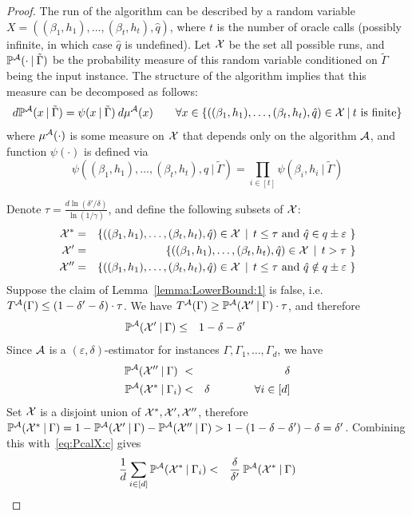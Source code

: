\documentclass[final,12pt]{colt2018}
\def\P{{\mathbb P}}
\def\calA{{\cal A}}
\def\calX{{\cal X}}
\begin{document}
\begin{proof}
The run of the algorithm can be described by a random variable $X=((\beta_1,h_1),\ldots,(\beta_t,h_t),\hat q)$,
where $t$ is the number of oracle calls (possibly infinite, in which case $\hat q$ is undefined).
Let $\calX$ be the set all possible runs, and %
 $\P^\calA(\cdot\:|\:\tilde\Gamma)$ be the probability measure of this random variable conditioned on
$\tilde\Gamma$ being the input instance. The structure of the algorithm implies that this measure can be decomposed as follows:
\begin{equation}
d\P^\calA(x\:|\:\tilde\Gamma)= \psi(x\:|\:\tilde\Gamma)\:d\mu^\calA(x)
\qquad\forall x\in\{((\beta_1,h_1),\ldots,(\beta_t,h_t),\hat q)\in\calX\:|\:\mbox{$t$ is finite}\}
\label{eq:GALSKGHAKSFJASG}
\end{equation}
where $\mu^\calA(\cdot)$ is some measure on $\calX$ that depends only on the algorithm $\calA$, and function $\psi(\cdot)$ is defined via
$$
\psi((\beta_1,h_1),\ldots,(\beta_t,h_t),\hat q\:|\:\tilde\Gamma)=\prod_{i\in[t]} \psi(\beta_i,h_i\:|\:\tilde\Gamma)
$$


Denote $\tau=\frac{d\ln(\delta'/\delta)}{\ln(1/\gamma)}$, and define the following subsets of $\calX$:
\begin{eqnarray*}
\calX^\ast & = & \{((\beta_1,h_1),\ldots,(\beta_t,h_t),\hat q)\in\calX \:\:|\:\: \mbox{$t\le \tau$ and $\hat q\in q\pm\varepsilon$  } \} \\
\calX' & = & \{((\beta_1,h_1),\ldots,(\beta_t,h_t),\hat q)\in\calX \:\:|\:\: \mbox{$t> \tau$ } \} \\
\calX'' & = & \{((\beta_1,h_1),\ldots,(\beta_t,h_t),\hat q)\in\calX \:\:|\:\: \mbox{$t\le \tau$ and $\hat q\notin q\pm\varepsilon$ } \} 
\end{eqnarray*}
Suppose the claim of Lemma~\ref{lemma:LowerBound:1} is false, i.e.\ $T^\calA(\Gamma)\le (1-\delta'-\delta)\cdot\tau$.
We have $T^\calA(\Gamma)\ge \P^\calA(\calX'\:|\:\Gamma)\cdot\tau$, and therefore
\begin{eqnarray}
\P^\calA(\calX'\:|\:\Gamma) & \le & 1-\delta-\delta' \qquad\qquad \label{eq:PcalX:a} 
\end{eqnarray}
Since $\calA$ is a $(\varepsilon,\delta)$-estimator for instances $\Gamma,\Gamma_1,\ldots,\Gamma_d$, we have
\begin{eqnarray}
\P^\calA(\calX''\:|\:\Gamma)~ & < & \delta \label{eq:PcalX:b} \\
\P^\calA(\calX^\ast\:|\:\Gamma_i) & < & \delta \qquad\qquad \forall i\in[d] \label{eq:PcalX:c} 
\end{eqnarray}
Set $\calX$ is a disjoint union of $\calX^\ast,\calX',\calX''$, therefore
$\P^\calA(\calX^\ast\:|\:\Gamma) =1-\P^\calA(\calX'\:|\:\Gamma)-\P^\calA(\calX''\:|\:\Gamma)>1-(1-\delta-\delta')-\delta=\delta'$.
Combining this with~\eqref{eq:PcalX:c} gives
\begin{eqnarray}
\frac{1}d\sum_{i\in[d]} \P^\calA(\calX^\ast\:|\:\Gamma_i) & < & \frac{\delta}{\delta'}\: \P^\calA(\calX^\ast\:|\:\Gamma)\label{eq:PcalX:e} 
\end{eqnarray}


\end{proof}
\end{document}
